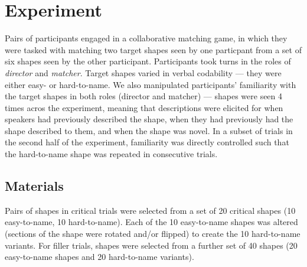 \documentclass[a4paper,man,natbib]{apa6}
\newcommand*{\term}[1]{\emph{#1}} %
\begin{document}



\section{Experiment}

Pairs of participants engaged in a collaborative matching game, in which they were tasked with matching two target shapes seen by one particpant from a set of six shapes seen by the other participant. 
Participants took turns in the roles of \term{director} and \term{matcher}.
Target shapes varied in verbal codability --- they were either easy- or hard-to-name.
We also manipulated participants' familiarity with the target shapes in both roles (director and matcher) --- shapes were seen 4 times acros the experiment, meaning that descriptions were elicited for when speakers had previously described the shape, when they had previously had the shape described to them, and when the shape was novel. 
In a subset of trials in the second half of the experiment, familiarity was directly controlled such that the hard-to-name shape was repeated in consecutive trials. 


\subsection{Materials}
Pairs of shapes in critical trials were selected from a set of 20 critical shapes (10 easy-to-name, 10 hard-to-name).
Each of the 10 easy-to-name shapes was altered (sections of the shape were rotated and/or flipped) to create the 10 hard-to-name variants. %
For filler trials, shapes were selected from a further set of 40 shapes (20 easy-to-name shapes and 20 hard-to-name variants). 
\end{document}
